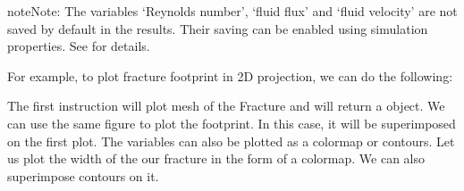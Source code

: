 \documentclass[letterpaper,10pt,english]{sphinxmanual}
\begin{document}
\begin{sphinxadmonition}{note}{Note:}
\sphinxAtStartPar
The variables ‘Reynolds number’, ‘fluid flux’ and ‘fluid velocity’ are not saved by default in the results. Their saving can be enabled using simulation properties. See  for details.
\end{sphinxadmonition}

\sphinxAtStartPar
For example, to plot fracture footprint in 2D projection, we can do the following:

\begin{sphinxVerbatim}[commandchars=\\\{\}]
   
    
\end{sphinxVerbatim}

\sphinxAtStartPar
The first instruction will plot mesh of the Fracture and will return a  object. We can use the same figure to plot the footprint. In this case, it will be superimposed on the first plot. The variables can also be plotted as a colormap or contours. Let us plot the width of the our fracture in the form of a colormap. We can also superimpose contours on it.

\begin{sphinxVerbatim}[commandchars=\\\{\}]
   
    
\end{sphinxVerbatim}
\end{document}
